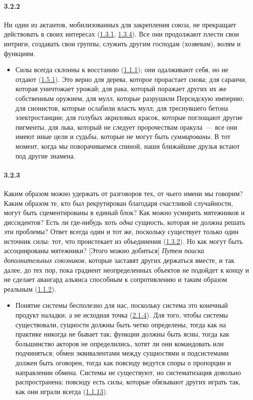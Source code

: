 \paragraph{3.2.2}\hypertarget{par:3.2.2}{} Ни один из актантов, мобилизованных для закрепления союза, не прекращает действовать в своих интересах (\hyperlink{par:1.3.1}{1.3.1}, \hyperlink{par:1.3.4}{1.3.4}). Все они продолжают плести свои интриги, создавать свои группы, служить другим господам (хозяевам), волям и функциям. 
	\begin{itemize}
	\item 
	Силы всегда склонны к восстанию (\hyperlink{par:1.1.1}{1.1.1}); они одалживают себя, но не отдают (\hyperlink{par:1.5.1}{1.5.1}). Это верно для дерева, которое прорастает снова; для саранчи, которая уничтожает урожай; для рака, который поражает других их же собственным оружием, для мулл, которые разрушили Персидскую империю; для сионистов, которые ослабили власть мулл; для треснувшего бетона электростанции; для голубых акриловых красок, которые поглощают другие пигменты, для льва, который не следует пророчествам оракула~--- все они имеют иные цели и судьбы, которые не могут быть {\itshape суммированы}. В тот момент, когда мы поворачиваемся спиной, наши ближайшие друзья встают под другие знамена.
	\end{itemize}

\paragraph{3.2.3}\hypertarget{par:3.2.3}{} Каким образом можно удержать от разговоров тех, от чьего имени мы говорим? Каким образом те, кто был рекрутирован благодаря счастливой случайности, могут быть сцементированы в единый блок? Как можно усмирить мятежников и диссидентов? Есть ли где-нибудь хоть {\itshape одна} сущность, которая не должна решать эти проблемы? Ответ всегда один и тот же, поскольку существует только один источник силы: тот, что проистекает из объединения (\hyperlink{par:1.3.2}{1.3.2}). Но как могут быть ассоциированы мятежники? [Этого можно добиться] {\itshape Путем поиска дополнительных союзников}, которые заставят других держаться вместе, и так далее, до тех пор, пока градиент неопределенных объектов не подойдет к концу и не сделает авангард альянса способным к сопротивлению и таким образом реальным (\hyperlink{par:1.1.2}{1.1.2}).
	\begin{itemize}
	\item 
	Понятие системы бесполезно для нас, поскольку система это конечный продукт наладки, а не исходная точка (\hyperlink{par:2.1.4}{2.1.4}). Для того, чтобы системы существовали, сущности должны быть четко определены, тогда как на практике никогда не бывает так; функции должны быть ясны, тогда как большинство акторов не определились, хотят ли они командовать или подчиняться; обмен эквивалентами между сущностями и подсистемами должен быть оговорен, тогда как повсюду ведутся споры о пропорции и направлении обмена. Системы не существуют, но систематизация довольно распространена; повсюду есть силы, которые обязывают других играть так, как они играли всегда (\hyperlink{par:1.1.13}{1.1.13}). 
	\end{itemize}

